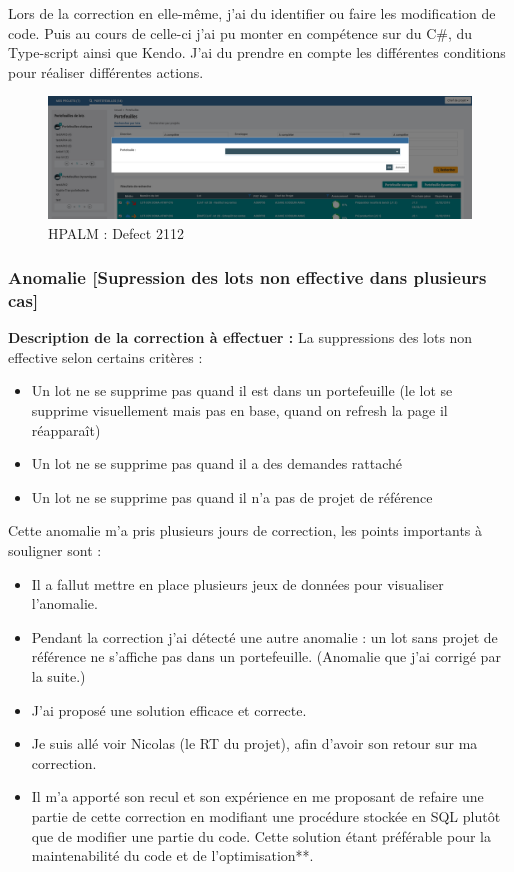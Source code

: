 Lors de la correction en elle-même, j'ai du identifier ou faire les modification de code. Puis au cours de celle-ci j'ai pu monter en compétence sur du C\#, du Type-script ainsi que Kendo. J'ai du prendre en compte les différentes conditions pour réaliser différentes actions. 

\begin{figure}[!h]
\centering
\includegraphics[width=1\textwidth]{images/correction1.PNG}
\caption{HPALM : Defect 2112}
\end{figure}

\subsubsection{Anomalie [Supression des lots non effective dans plusieurs cas]}

\textbf{Description de la correction à effectuer :} 
La suppressions des lots non effective selon certains critères :
\begin{itemize}
    \item Un lot ne se supprime pas quand il est dans un portefeuille (le lot se supprime visuellement mais pas en base, quand on refresh la page il réapparaît)
    \item Un lot ne se supprime pas quand il a des demandes rattaché
    \item Un lot ne se supprime pas quand il n'a pas de projet de référence
\end{itemize}

Cette anomalie m'a pris plusieurs jours de correction, les points importants à souligner sont : 
\begin{itemize}
    \item Il a fallut mettre en place plusieurs jeux de données pour visualiser l'anomalie.
    \item Pendant la correction j'ai détecté une autre anomalie : un lot sans projet de référence ne s'affiche pas dans un portefeuille. (Anomalie que j'ai corrigé par la suite.)
    \item J'ai proposé une solution efficace et correcte.
    \item Je suis allé voir Nicolas (le RT du projet), afin d'avoir son retour sur ma correction.
    \item Il m'a apporté son recul et son expérience en me proposant de refaire une partie de cette correction en modifiant une procédure stockée en SQL plutôt que de modifier une partie du code. Cette solution étant préférable pour la maintenabilité du code et de l'optimisation**.
\end{itemize}

